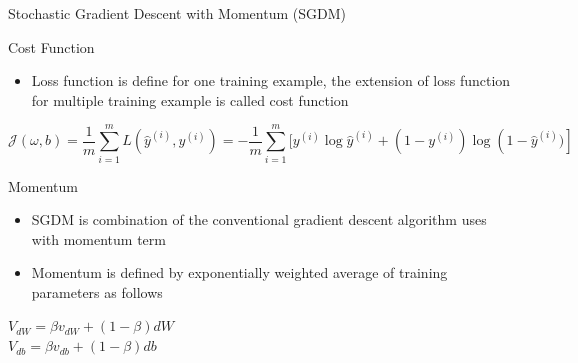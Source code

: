 \documentclass[10pt]{beamer}
\begin{document}
\begin{frame}{Stochastic Gradient Descent with Momentum (SGDM)}
    \begin{block}{Cost Function}
        \begin{itemize}
            \item Loss function is define for one training example, the extension of loss function for multiple training example is called cost function 
        \end{itemize}
            \vspace{1pt}
            \centering
            $$\mathcal{J}(\omega, b)=\frac{1}{m} \sum_{i=1}^{m} L\left(\hat{y}^{(i)}, y^{(i)}\right)=-\frac{1}{m} \sum_{i=1}^{m} [y^{(i)} \log \hat{y}^{(i)}+\left(1-y^{(i)}\right) \log \left(1 - \hat{y}^{(i)})\right]$$ 
    \end{block}
    
    \begin{block}{Momentum}
         \begin{itemize}
             \item SGDM is combination of the conventional gradient descent algorithm uses with momentum term 
             \item Momentum is defined by exponentially weighted average of training parameters as follows
         \end{itemize}
            \centering
            $V_{d W}=\beta v_{d W}+(1-\beta) d W$ \\
            $V_{d b}=\beta v_{d b}+(1-\beta) d b$
    \end{block}
\end{frame}
\end{document}
